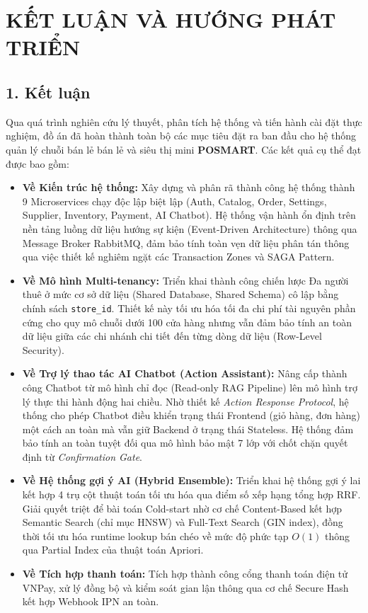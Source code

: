 \documentclass[12pt,a4paper]{report}
\begin{document}
\chapter*{KẾT LUẬN VÀ HƯỚNG PHÁT TRIỂN}

\section*{1. Kết luận}
Qua quá trình nghiên cứu lý thuyết, phân tích hệ thống và tiến hành cài đặt thực nghiệm, đồ án đã hoàn thành toàn bộ các mục tiêu đặt ra ban đầu cho hệ thống quản lý chuỗi bán lẻ bán lẻ và siêu thị mini \textbf{POSMART}. Các kết quả cụ thể đạt được bao gồm:

\begin{itemize}[leftmargin=*]
    \item \textbf{Về Kiến trúc hệ thống:} Xây dựng và phân rã thành công hệ thống thành 9 Microservices chạy độc lập biệt lập (Auth, Catalog, Order, Settings, Supplier, Inventory, Payment, AI Chatbot). Hệ thống vận hành ổn định trên nền tảng luồng dữ liệu hướng sự kiện (Event-Driven Architecture) thông qua Message Broker RabbitMQ, đảm bảo tính toàn vẹn dữ liệu phân tán thông qua việc thiết kế nghiêm ngặt các Transaction Zones và SAGA Pattern.
    \item \textbf{Về Mô hình Multi-tenancy:} Triển khai thành công chiến lược Đa người thuê ở mức cơ sở dữ liệu (Shared Database, Shared Schema) cô lập bằng chính sách \texttt{store\_id}. Thiết kế này tối ưu hóa tối đa chi phí tài nguyên phần cứng cho quy mô chuỗi dưới 100 cửa hàng nhưng vẫn đảm bảo tính an toàn dữ liệu giữa các chi nhánh chi tiết đến từng dòng dữ liệu (Row-Level Security).
    \item \textbf{Về Trợ lý thao tác AI Chatbot (Action Assistant):} Nâng cấp thành công Chatbot từ mô hình chỉ đọc (Read-only RAG Pipeline) lên mô hình trợ lý thực thi hành động hai chiều. Nhờ thiết kế \textit{Action Response Protocol}, hệ thống cho phép Chatbot điều khiển trạng thái Frontend (giỏ hàng, đơn hàng) một cách an toàn mà vẫn giữ Backend ở trạng thái Stateless. Hệ thống đảm bảo tính an toàn tuyệt đối qua mô hình bảo mật 7 lớp với chốt chặn quyết định từ \textit{Confirmation Gate}.
    \item \textbf{Về Hệ thống gợi ý AI (Hybrid Ensemble):} Triển khai hệ thống gợi ý lai kết hợp 4 trụ cột thuật toán tối ưu hóa qua điểm số xếp hạng tổng hợp RRF. Giải quyết triệt để bài toán Cold-start nhờ cơ chế Content-Based kết hợp Semantic Search (chỉ mục HNSW) và Full-Text Search (GIN index), đồng thời tối ưu hóa runtime lookup bán chéo về mức độ phức tạp $O(1)$ thông qua Partial Index của thuật toán Apriori.
    \item \textbf{Về Tích hợp thanh toán:} Tích hợp thành công cổng thanh toán điện tử VNPay, xử lý đồng bộ và kiểm soát gian lận thông qua cơ chế Secure Hash kết hợp Webhook IPN an toàn.
\end{itemize}
\end{document}
